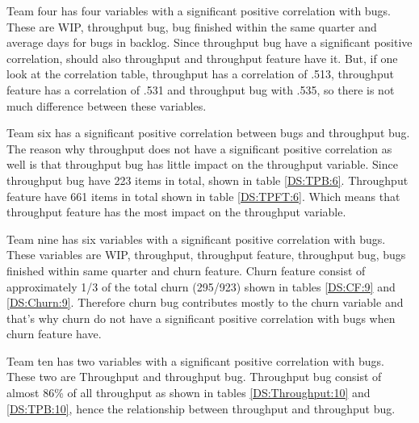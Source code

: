 \documentclass[UKenglish]{ifimaster}  %
\begin{document}
Team four has four variables with a significant positive correlation with bugs. These are WIP, throughput bug, bug finished within the same quarter and average days for bugs in backlog. Since throughput bug have a significant positive correlation, should also throughput and throughput feature have it. But, if one look at the correlation table, throughput has a correlation of .513, throughput feature has a correlation of .531 and throughput bug with .535, so there is not much difference between these variables.

Team six has a significant positive correlation between bugs and throughput bug. The reason why throughput does not have a significant positive correlation as well is that throughput bug has little impact on the throughput variable. Since throughput bug have 223 items in total, shown in table \ref{DS:TPB:6}. Throughput feature have 661 items in total shown in table \ref{DS:TPFT:6}. Which means that throughput feature has the most impact on the throughput variable. 

Team nine has six variables with a significant positive correlation with bugs. These variables are WIP, throughput, throughput feature, throughput bug, bugs finished within same quarter and churn feature. Churn feature consist of approximately 1/3 of the total churn (295/923) shown in tables \ref{DS:CF:9} and \ref{DS:Churn:9}. Therefore churn bug contributes mostly to the churn variable and that's why churn do not have a significant positive correlation with bugs when churn feature have. 

Team ten has two variables with a significant positive correlation with bugs. These two are Throughput and throughput bug. Throughput bug consist of almost 86\% of all throughput as shown in tables \ref{DS:Throughput:10} and \ref{DS:TPB:10}, hence the relationship between throughput and throughput bug. 
\end{document}
